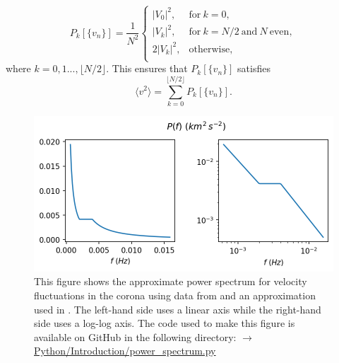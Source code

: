\begin{equation}
    \label{eq:discrete_power_spectrum_definition}
    P_k[\{v_n\}] = \frac{1}{N^2}\begin{cases}
    |V_0|^2, & \text{for}\ k=0,\\
    |V_k|^2, & \text{for}\ k=N/2\ \text{and}\ N\ \text{even},\\
    2|V_k|^2, & \text{otherwise},\\
    \end{cases}
\end{equation}
where $k=0,1...,\lfloor N / 2\rfloor$. This ensures that $P_k[\{v_n\}]$ satisfies
\begin{equation}
    \langle v^2 \rangle = \sum_{k=0}^{\lfloor N / 2 \rfloor}P_k[\{v_n\}].
\end{equation}

\begin{figure}
    \vspace{-20pt}
    \centering
    \includegraphics[width=\textwidth]{figures/introduction/power_spectrum_morton.png}
    \vspace{-35pt}
    \caption{This figure shows the approximate power spectrum for velocity fluctuations in the corona using data from \citet{Morton2016} and an approximation used in \citet{Pagano2019}. The left-hand side uses a linear axis while the right-hand side uses a log-log axis. The code used to make this figure is available on GitHub in the following directory:\newline
    \href{https://github.com/aleksyprok/apkp_thesis/blob/main/Python/Introduction/power_spectrum.py}{$\rightarrow$ Python/Introduction/power\_spectrum.py}}
    \vspace{-10pt}
    \label{fig:power_spectrum_morton}
\end{figure}

